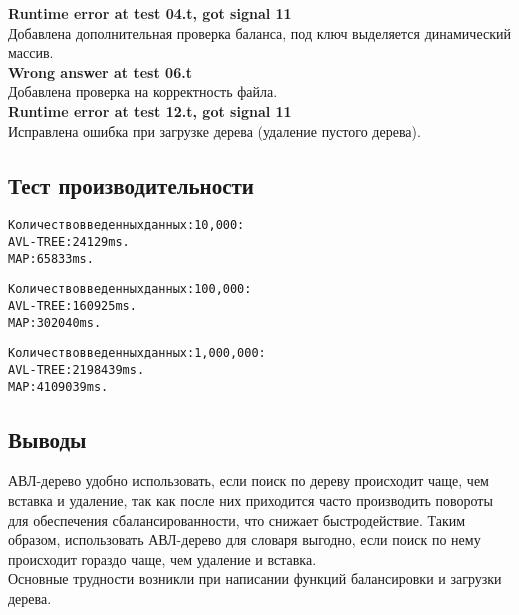 \documentclass[12pt]{article}
\begin{document}
	\indent \textbf{Runtime error at test 04.t, got signal 11}\\
	Добавлена дополнительная проверка баланса, под ключ выделяется динамический массив.\\
	\indent \textbf{Wrong answer at test 06.t}\\
	Добавлена проверка на корректность файла.\\
	\indent \textbf{Runtime error at test 12.t, got signal 11}\\
	Исправлена ошибка при загрузке дерева (удаление пустого дерева).

	\subsection*{Тест производительности}
	\begin{alltt}
		Количество введенных данных: 10,000:
		AVL-TREE: 24129 ms.
		     MAP: 65833 ms.
		
		Количество введенных данных: 100,000:
		AVL-TREE: 160925 ms.
		     MAP: 302040 ms.
		
		Количество введенных данных: 1,000,000:
		AVL-TREE: 2198439 ms.
		     MAP: 4109039 ms.
	\end{alltt}
	
	\subsection*{Выводы}

	АВЛ-дерево удобно использовать, если поиск по дереву происходит чаще, чем вставка и удаление, так как после них приходится часто производить повороты для обеспечения сбалансированности, что снижает быстродействие. Таким образом, использовать АВЛ-дерево для словаря выгодно, если поиск по нему происходит гораздо чаще, чем удаление и вставка.\\
	Основные трудности возникли при написании функций балансировки и загрузки дерева.

	
\end{document}
